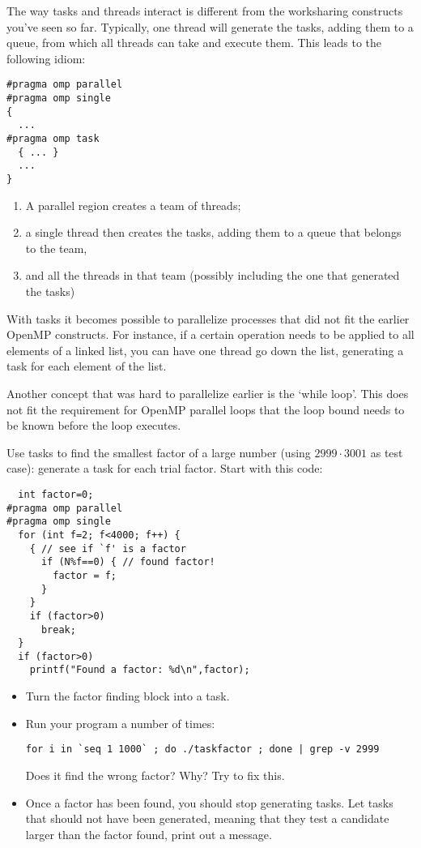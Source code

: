 The way tasks and threads interact is different from the worksharing
constructs you've seen so far. Typically, one thread will generate the
tasks, adding them to a queue, from which all threads can take and
execute them. This leads to the following idiom:
\begin{verbatim}
#pragma omp parallel
#pragma omp single
{
  ...
#pragma omp task
  { ... }
  ...
}
\end{verbatim}
\begin{enumerate}
\item A parallel region creates a team of threads;
\item a single thread then creates the tasks, adding them to a queue
  that belongs to the team,
\item and all the threads in that team (possibly including the one
  that generated the tasks) 
\end{enumerate}

With tasks it becomes possible to parallelize processes that did not
fit the earlier OpenMP constructs. For instance, if a certain
operation needs to be applied to all elements of a linked list, you
can have one thread go down the list, generating a task for each
element of the list.

Another concept that was hard to parallelize earlier is the `while
loop'. This does not fit the requirement for OpenMP parallel loops
that the loop bound needs to be known before the loop executes.

\begin{exercise}
  \label{ex:taskfactor}
  Use tasks to find the smallest factor of a large
  number (using $2999\cdot 3001$ as test case): generate a task for each
  trial factor. Start with this code:
\begin{verbatim}
  int factor=0;
#pragma omp parallel
#pragma omp single
  for (int f=2; f<4000; f++) {
    { // see if `f' is a factor
      if (N%f==0) { // found factor!
        factor = f;
      }
    }
    if (factor>0)
      break;
  }
  if (factor>0)
    printf("Found a factor: %d\n",factor);
\end{verbatim}
  \begin{itemize}
  \item Turn the factor finding block into a task.
  \item Run your program a number of times:
\begin{verbatim}
for i in `seq 1 1000` ; do ./taskfactor ; done | grep -v 2999
\end{verbatim}
    Does it find the wrong factor? Why? Try to fix this.
\item Once a factor has been found, you should stop generating
    tasks.
    Let tasks that should not have been generated, meaning that they
    test a candidate larger than the factor found, print out a message.
  \end{itemize}
\end{exercise}


